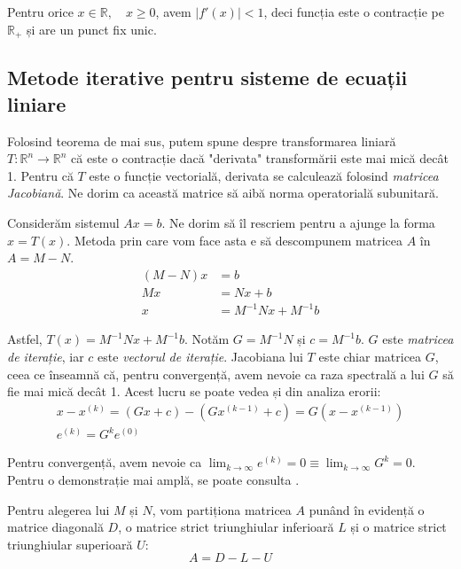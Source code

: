 \documentclass{exam}
\begin{document}
Pentru orice $x \in \mathbb{R}, \quad x \geq 0$, avem $|f'(x)| < 1$, deci
funcția este o contracție pe $\mathbb{R}_+$ și are un punct fix unic.

\subsection{Metode iterative pentru sisteme de ecuații liniare}

Folosind teorema de mai sus, putem spune despre transformarea liniară
$T : \mathbb{R}^n \rightarrow \mathbb{R}^n$ că este o contracție dacă
"derivata" transformării este mai mică decât 1. Pentru că $T$ este o funcție
vectorială, derivata se calculează folosind \textit{matricea Jacobiană}. Ne
dorim ca această matrice să aibă norma operatorială subunitară.

Considerăm sistemul $Ax = b$. Ne dorim să îl rescriem pentru a ajunge la forma
$x = T(x)$. Metoda prin care vom face asta e să descompunem matricea $A$ în
$A = M - N$.
\begin{align*}
	(M - N)x & = b                  \\
	Mx       & = Nx + b             \\
	x        & = M^{-1}Nx + M^{-1}b
\end{align*}

Astfel, $T(x) = M^{-1}Nx + M^{-1}b$. Notăm $G = M^{-1}N$ și $c = M^{-1}b$. $G$
este \textit{matricea de iterație}, iar $c$ este \textit{vectorul de iterație}.
Jacobiana lui $T$ este chiar matricea $G$, ceea ce înseamnă că, pentru
convergență, avem nevoie ca raza spectrală a lui $G$ să fie mai mică decât 1.
Acest lucru se poate vedea și din analiza erorii:
\begin{gather*}
	x - x^{(k)} = (Gx + c) - (Gx^{(k - 1)} + c) = G(x - x^{(k - 1)}) \\
	e^{(k)} = G^k e^{(0)}
\end{gather*}

Pentru convergență, avem nevoie ca $\lim_{k \to \infty} e^{(k)} = 0 \equiv \lim_{k \to \infty} G^k = 0$.
Pentru o demonstrație mai amplă, se poate consulta \cite{Hansen}.

Pentru alegerea lui $M$ și $N$, vom partiționa matricea $A$ punând în
evidență o matrice diagonală $D$, o matrice strict triunghiular
inferioară $L$ și o matrice strict triunghiular superioară $U$:
\begin{equation*}
	A = D - L - U
\end{equation*}
\end{document}

